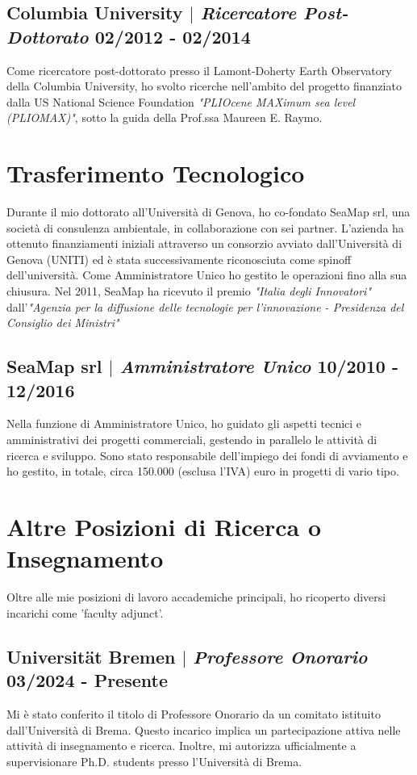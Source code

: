 \documentclass[11pt]{article}
\begin{document}
\subsection{Columbia University $|$ {\normalfont\textit{Ricercatore Post-Dottorato}} \hfill 02/2012 - 02/2014}
{\footnotesize Come ricercatore post-dottorato presso il Lamont-Doherty Earth Observatory della Columbia University, ho svolto ricerche nell'ambito del progetto finanziato dalla US National Science Foundation \textit{"PLIOcene MAXimum sea level (PLIOMAX)"}, sotto la guida della Prof.ssa Maureen E. Raymo.}

\section{Trasferimento Tecnologico}
{\normalfont Durante il mio dottorato all'Università di Genova, ho co-fondato SeaMap srl, una società di consulenza ambientale, in collaborazione con sei partner. L'azienda ha ottenuto finanziamenti iniziali attraverso un consorzio avviato dall'Università di Genova (UNITI) ed è stata successivamente riconosciuta come spinoff dell'università. Come Amministratore Unico ho gestito le operazioni fino alla sua chiusura. Nel 2011, SeaMap ha ricevuto il premio \textit{"Italia degli Innovatori"} dall'\textit{"Agenzia per la diffusione delle tecnologie per l’innovazione - Presidenza del Consiglio dei Ministri"}}\\
\bigskip

\subsection{SeaMap srl $|$ {\normalfont\textit{Amministratore Unico}} \hfill 10/2010 - 12/2016}
{\footnotesize Nella funzione di Amministratore Unico, ho guidato gli aspetti tecnici e amministrativi dei progetti commerciali, gestendo in parallelo le attività di ricerca e sviluppo. Sono stato responsabile dell'impiego dei fondi di avviamento e ho gestito, in totale, circa 150.000 (esclusa l'IVA) euro in progetti di vario tipo.}
\bigskip

\section{Altre Posizioni di Ricerca o Insegnamento}
{\normalfont Oltre alle mie posizioni di lavoro accademiche principali, ho ricoperto diversi incarichi come 'faculty adjunct'.}\\
\bigskip

\subsection{Universität Bremen $|$ {\normalfont\textit{Professore Onorario}} \hfill 03/2024 - Presente}
{\footnotesize Mi è stato conferito il titolo di Professore Onorario da un comitato istituito dall'Università di Brema. Questo incarico implica un partecipazione attiva nelle attività di insegnamento e ricerca. Inoltre, mi autorizza ufficialmente a supervisionare Ph.D. students presso l'Università di Brema.}
\bigskip
\end{document}
